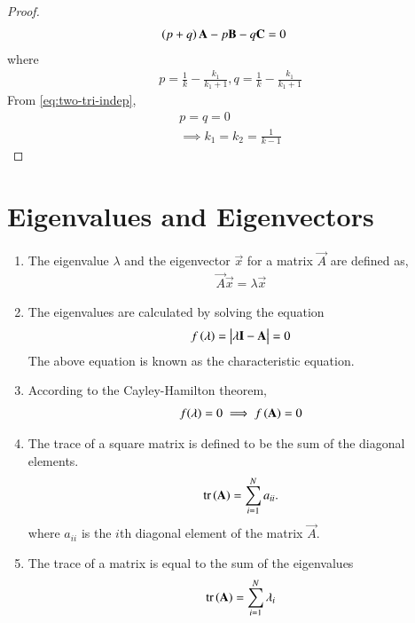 \begin{enumerate}[label=\thesection.\arabic*.,ref=\thesection.\theenumi]
\begin{proof}
  \begin{align}
\left(p+q\right)\mathbf{A}- p\mathbf{B} -q\mathbf{C} &= 0
  \end{align}
  where
  \begin{align}
	  p = \frac{1}{k} -  \frac{k_1}{k_1+1},
	  q = \frac{1}{k} -  \frac{k_1}{k_1+1}
  \end{align}
From 	  
	  \eqref{eq:two-tri-indep},
  \begin{align}
	p = q = 0
	  \\
	  \implies k_1 = k_2  = \frac{1}{k-1}
  \end{align}

	  \end{proof}
\end{enumerate}
\section{Eigenvalues and Eigenvectors}
\begin{enumerate}[label=\thesection.\arabic*.,ref=\thesection.\theenumi]
\item The eigenvalue $\lambda$ and the eigenvector $\vec{x}$  for a matrix $\vec{A}$ are defined as, 
\begin{align}
  \vec{A} \vec{x} = \lambda \vec{x}
\end{align}
\item The eigenvalues are calculated by solving the
equation
\begin{align}
  \label{eq:chareq}
f\left(\lambda\right) = \begin{vmatrix}\lambda \mathbf{I}- \mathbf{A} \end{vmatrix} =0
\end{align}
The above equation is known as the characteristic equation.
\item According to the Cayley-Hamilton theorem,
\begin{align}
	\label{eq:cayley}
  f(\lambda) = 0 \implies f\left(\mathbf{A}\right) = 0
\end{align}
\item The trace of a square  matrix is defined to be the sum of the diagonal elements.
\begin{align}
	\label{eq:trace}
	\text{tr}\left(\mathbf{A}\right)=\sum_{i=1}^{N}a_{ii}.
\end{align}
	where $a_{ii}$ is the $i$th diagonal element of the matrix $\vec{A}$. 	
\item The trace of a matrix is equal to the sum of the eigenvalues
\begin{align}
	\label{eq:trace_eig}
	\text{tr}\left(\mathbf{A}\right)=\sum_{i=1}^{N}\lambda_i
\end{align}


\end{enumerate}
